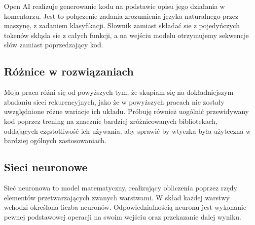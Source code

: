 Open AI \cite{openai} realizuje generowanie kodu na podstawie opisu jego działania w komentarzu. Jest to połączenie zadania zrozumienia 
języka naturalnego przez maszynę, z zadaniem klasyfikacji. Słownik zamiast składać sie z pojedyńczych tokenów skłąda sie z całych funkcji, 
a na wejściu modelu otrzymujemy sekwencje słów zamiast poprzedzający kod. 

\subsection{Różnice w rozwiązaniach}
Moja praca różni się od powyższych tym, że skupiam się na dokładniejszym zbadaniu sieci rekurencyjnych, jako że w powyższych pracach nie zostały uwzględnione różne wariacje ich układu.
 Próbuję również uogólnić przewidywany kod poprzez trening na znacznie bardziej zróżnicowanych bibliotekach, oddających częstotliwość ich używania,
 aby sprawić by wtyczka była użyteczna w bardziej ogólnych zastosowaniach. 
\subsection {Sieci neuronowe}
Sieć neuronowa to model matematyczny, realizujący obliczenia poprzez rzędy elementów przetwarzających zwanych warstwami. W skład każdej warstwy wchodzi 
określona liczba neuronów. Odpowiedzialnością neuronu jest wykonanie pewnej podstawowej operacji na swoim wejściu oraz przekazanie dalej wyniku. 

